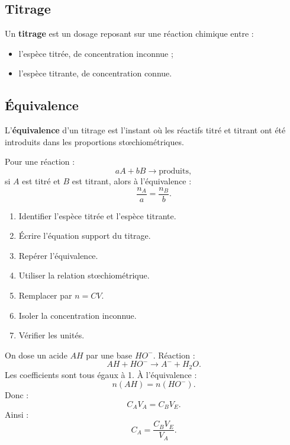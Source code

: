 \documentclass[11pt,a4paper]{article}
\begin{document}
\subsection{Titrage}

\begin{definition}
Un \textbf{titrage} est un dosage reposant sur une réaction chimique entre :
\begin{itemize}
  \item l'espèce titrée, de concentration inconnue ;
  \item l'espèce titrante, de concentration connue.
\end{itemize}
\end{definition}

\subsection{Équivalence}

\begin{definition}
L'\textbf{équivalence} d'un titrage est l'instant où les réactifs titré et titrant ont été introduits dans les proportions stœchiométriques.
\end{definition}

Pour une réaction :
\[
aA+bB\longrightarrow \text{produits},
\]
si $A$ est titré et $B$ est titrant, alors à l'équivalence :
\[
\frac{n_A}{a}=\frac{n_B}{b}.
\]

\begin{methode}
\begin{enumerate}
  \item Identifier l'espèce titrée et l'espèce titrante.
  \item Écrire l'équation support du titrage.
  \item Repérer l'équivalence.
  \item Utiliser la relation stœchiométrique.
  \item Remplacer par $n=CV$.
  \item Isoler la concentration inconnue.
  \item Vérifier les unités.
\end{enumerate}
\end{methode}

\begin{exemple}
On dose un acide $AH$ par une base $HO^-$.  
Réaction :
\[
AH+HO^- \longrightarrow A^-+H_2O.
\]
Les coefficients sont tous égaux à 1.  
À l'équivalence :
\[
n(AH)=n(HO^-).
\]
Donc :
\[
C_A V_A=C_B V_E.
\]
Ainsi :
\[
C_A=\frac{C_BV_E}{V_A}.
\]
\end{exemple}
\end{document}
